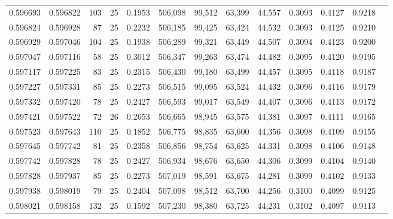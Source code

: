 \begin{tabular}{rrrrrrrrrrrrr}
0.596693 & 0.596822 &   103 &  25 &                                     0.1953 & 506,098 &  99,512 &  63,399 &  44,557 & 0.3093 & 0.4127 & 0.9218 \\
0.596824 & 0.596928 &    87 &  25 &                                     0.2232 & 506,185 &  99,425 &  63,424 &  44,532 & 0.3093 & 0.4125 & 0.9210 \\
0.596929 & 0.597046 &   104 &  25 &                                     0.1938 & 506,289 &  99,321 &  63,449 &  44,507 & 0.3094 & 0.4123 & 0.9200 \\
0.597047 & 0.597116 &    58 &  25 &                                     0.3012 & 506,347 &  99,263 &  63,474 &  44,482 & 0.3095 & 0.4120 & 0.9195 \\
0.597117 & 0.597225 &    83 &  25 &                                     0.2315 & 506,430 &  99,180 &  63,499 &  44,457 & 0.3095 & 0.4118 & 0.9187 \\
0.597227 & 0.597331 &    85 &  25 &                                     0.2273 & 506,515 &  99,095 &  63,524 &  44,432 & 0.3096 & 0.4116 & 0.9179 \\
0.597332 & 0.597420 &    78 &  25 &                                     0.2427 & 506,593 &  99,017 &  63,549 &  44,407 & 0.3096 & 0.4113 & 0.9172 \\
0.597421 & 0.597522 &    72 &  26 &                                     0.2653 & 506,665 &  98,945 &  63,575 &  44,381 & 0.3097 & 0.4111 & 0.9165 \\
0.597523 & 0.597643 &   110 &  25 &                                     0.1852 & 506,775 &  98,835 &  63,600 &  44,356 & 0.3098 & 0.4109 & 0.9155 \\
0.597645 & 0.597742 &    81 &  25 &                                     0.2358 & 506,856 &  98,754 &  63,625 &  44,331 & 0.3098 & 0.4106 & 0.9148 \\
0.597742 & 0.597828 &    78 &  25 &                                     0.2427 & 506,934 &  98,676 &  63,650 &  44,306 & 0.3099 & 0.4104 & 0.9140 \\
0.597828 & 0.597937 &    85 &  25 &                                     0.2273 & 507,019 &  98,591 &  63,675 &  44,281 & 0.3099 & 0.4102 & 0.9133 \\
0.597938 & 0.598019 &    79 &  25 &                                     0.2404 & 507,098 &  98,512 &  63,700 &  44,256 & 0.3100 & 0.4099 & 0.9125 \\
0.598021 & 0.598158 &   132 &  25 &                                     0.1592 & 507,230 &  98,380 &  63,725 &  44,231 & 0.3102 & 0.4097 & 0.9113 \\

\end{tabular}
